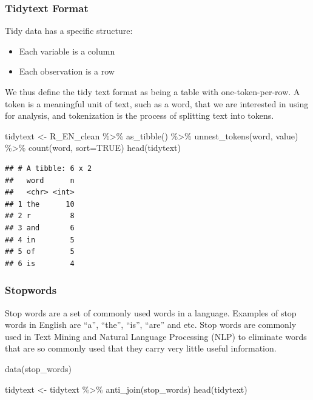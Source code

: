 \documentclass[
]{book}
\newenvironment{Shaded}{\begin{snugshade}}{\end{snugshade}}
\newcommand{\AttributeTok}[1]{\textcolor[rgb]{0.77,0.63,0.00}{#1}}
\newcommand{\ConstantTok}[1]{\textcolor[rgb]{0.00,0.00,0.00}{#1}}
\newcommand{\FunctionTok}[1]{\textcolor[rgb]{0.00,0.00,0.00}{#1}}
\newcommand{\NormalTok}[1]{#1}
\newcommand{\OtherTok}[1]{\textcolor[rgb]{0.56,0.35,0.01}{#1}}
\newcommand{\SpecialCharTok}[1]{\textcolor[rgb]{0.00,0.00,0.00}{#1}}
\providecommand{\tightlist}{%
  \setlength{\itemsep}{0pt}\setlength{\parskip}{0pt}}
\begin{document}
\hypertarget{tidytext-format}{%
\subsubsection{Tidytext Format}\label{tidytext-format}}

Tidy data has a specific structure:

\begin{itemize}
\tightlist
\item
  Each variable is a column
\item
  Each observation is a row
\end{itemize}

We thus define the tidy text format as being a table with one-token-per-row. A token is a meaningful unit of text, such as a word, that we are interested in using for analysis, and tokenization is the process of splitting text into tokens.

\begin{Shaded}
\begin{Highlighting}[]
\NormalTok{tidytext }\OtherTok{\textless{}{-}}\NormalTok{ R\_EN\_clean }\SpecialCharTok{\%\textgreater{}\%}
  \FunctionTok{as\_tibble}\NormalTok{() }\SpecialCharTok{\%\textgreater{}\%}
  \FunctionTok{unnest\_tokens}\NormalTok{(word, value) }\SpecialCharTok{\%\textgreater{}\%}
  \FunctionTok{count}\NormalTok{(word, }\AttributeTok{sort=}\ConstantTok{TRUE}\NormalTok{)}
\FunctionTok{head}\NormalTok{(tidytext)}
\end{Highlighting}
\end{Shaded}

\begin{verbatim}
## # A tibble: 6 x 2
##   word      n
##   <chr> <int>
## 1 the      10
## 2 r         8
## 3 and       6
## 4 in        5
## 5 of        5
## 6 is        4
\end{verbatim}

\hypertarget{stopwords}{%
\subsubsection{Stopwords}\label{stopwords}}

Stop words are a set of commonly used words in a language. Examples of stop words in English are ``a'', ``the'', ``is'', ``are'' and etc. Stop words are commonly used in Text Mining and Natural Language Processing (NLP) to eliminate words that are so commonly used that they carry very little useful information.

\begin{Shaded}
\begin{Highlighting}[]
\FunctionTok{data}\NormalTok{(stop\_words)}

\NormalTok{tidytext }\OtherTok{\textless{}{-}}\NormalTok{ tidytext }\SpecialCharTok{\%\textgreater{}\%}
  \FunctionTok{anti\_join}\NormalTok{(stop\_words)}
\FunctionTok{head}\NormalTok{(tidytext)}
\end{Highlighting}
\end{Shaded}
\end{document}
